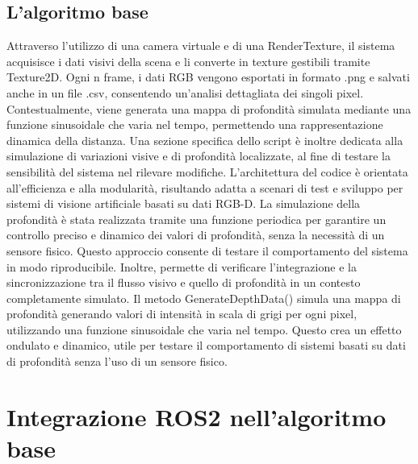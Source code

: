 \documentclass[11pt]{report}
\begin{document}
\subsection{L'algoritmo base}
\onehalfspacing
Attraverso l'utilizzo di una camera virtuale e di una RenderTexture, il sistema acquisisce i dati visivi della scena e li converte in texture gestibili tramite Texture2D.
 Ogni n frame, i dati RGB vengono esportati in formato .png e salvati anche in un file .csv, consentendo un'analisi dettagliata dei singoli pixel. Contestualmente, viene generata una mappa di profondità simulata mediante una funzione sinusoidale che varia nel tempo, permettendo una rappresentazione dinamica della distanza. Una sezione specifica dello script è inoltre dedicata alla simulazione di variazioni visive e di profondità localizzate, al fine di testare la sensibilità del sistema nel rilevare modifiche. L’architettura del codice è orientata all’efficienza e alla modularità, risultando adatta a scenari di test e sviluppo per sistemi di visione artificiale basati su dati RGB-D.
La simulazione della profondità è stata realizzata tramite una funzione periodica per garantire un controllo preciso e dinamico dei valori di profondità, senza la necessità di un sensore fisico. Questo approccio consente di testare il comportamento del sistema in modo riproducibile. Inoltre, permette di verificare l’integrazione e la sincronizzazione tra il flusso visivo e quello di profondità in un contesto completamente simulato.
 Il metodo GenerateDepthData() simula una mappa di profondità generando valori di intensità in scala di grigi per ogni pixel, utilizzando una funzione sinusoidale che varia nel tempo. Questo crea un effetto ondulato e dinamico, utile per testare il comportamento di sistemi basati su dati di profondità senza l’uso di un sensore fisico.

\section{Integrazione ROS2 nell'algoritmo base}
\end{document}
